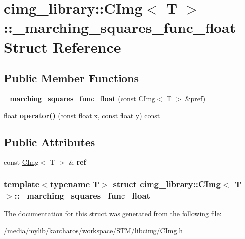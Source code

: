 \hypertarget{structcimg__library_1_1_c_img_1_1__marching__squares__func__float}{
\section{cimg\_\-library::CImg$<$ T $>$::\_\-marching\_\-squares\_\-func\_\-float Struct Reference}
\label{structcimg__library_1_1_c_img_1_1__marching__squares__func__float}
}
\subsection*{Public Member Functions}
\begin{DoxyCompactItemize}
\item 
\hypertarget{structcimg__library_1_1_c_img_1_1__marching__squares__func__float_a123194ace14b163ff599442b33e46ef9}{
{\bfseries \_\-marching\_\-squares\_\-func\_\-float} (const \hyperlink{structcimg__library_1_1_c_img}{CImg}$<$ T $>$ \&pref)}
\label{structcimg__library_1_1_c_img_1_1__marching__squares__func__float_a123194ace14b163ff599442b33e46ef9}

\item 
\hypertarget{structcimg__library_1_1_c_img_1_1__marching__squares__func__float_a67f832549419a9cae2815bb74dd2564e}{
float {\bfseries operator()} (const float x, const float y) const }
\label{structcimg__library_1_1_c_img_1_1__marching__squares__func__float_a67f832549419a9cae2815bb74dd2564e}

\end{DoxyCompactItemize}
\subsection*{Public Attributes}
\begin{DoxyCompactItemize}
\item 
\hypertarget{structcimg__library_1_1_c_img_1_1__marching__squares__func__float_a0073b957a8eb58145a58d89619383596}{
const \hyperlink{structcimg__library_1_1_c_img}{CImg}$<$ T $>$ \& {\bfseries ref}}
\label{structcimg__library_1_1_c_img_1_1__marching__squares__func__float_a0073b957a8eb58145a58d89619383596}

\end{DoxyCompactItemize}
\subsubsection*{template$<$typename T$>$ struct cimg\_\-library::CImg$<$ T $>$::\_\-marching\_\-squares\_\-func\_\-float}



The documentation for this struct was generated from the following file:\begin{DoxyCompactItemize}
\item 
/media/mylib/kantharos/workspace/STM/libcimg/CImg.h\end{DoxyCompactItemize}
